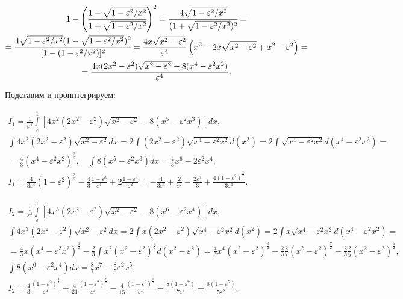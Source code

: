\documentclass[a4paper,12pt]{article} %
\newcommand{\eps}{\varepsilon}
\begin{document}
\begin{equation}
\begin{gathered}
    1 - \Bigg(\cfrac{1 - \sqrt{1 - \eps^2/x^2}}{1 + \sqrt{1 - \eps^2 /
    x^2}}\Bigg)^2 =
    \cfrac{4\sqrt{1 - \eps^2 / x^2}}{(1 + \sqrt{1 - \eps^2 / x^2})^2}=\\
    =\cfrac{4\sqrt{1 - \eps^2 / x^2}(1 - \sqrt{1 - \eps^2 / x^2})^2}
    {[1 - (1 - \eps^2 / x^2)]^2}= \frac{4x\sqrt{x^2-\eps^2}}{\eps^4}
    \left(x^2 - 2x\sqrt{x^2-\eps^2} + x^2 - \eps^2\right)=\\
    =\frac{4x(2x^2-\eps^2)\sqrt{x^2-\eps^2}-8(x^4-\eps^2x^2)}{\eps^4}.
\end{gathered}
\end{equation}

Подставим и проинтегрируем:

\begin{equation}
\begin{gathered}
    I_1 = \frac{1}{\eps^4}\int\limits_\eps^1
    [4x^2(2x^2-\eps^2)\sqrt{x^2-\eps^2}-8(x^5-\eps^2x^3)]dx,\\
    \int 4x^2(2x^2-\eps^2)\sqrt{x^2-\eps^2} dx =
    2\int (2x^2-\eps^2)\sqrt{x^4-\eps^2x^2} d(x^2) =
    2\int \sqrt{x^4-\eps^2x^2} d(x^4-\eps^2x^2) =\\=
    \frac{4}{3}(x^4-\eps^2x^2)^\frac{3}{2},\quad
    \int 8(x^5-\eps^2x^3)dx = \frac{4}{3}x^6 - 2\eps^2x^4,\\
    I_1 = \frac{4}{3\eps^4}(1-\eps^2)^\frac{3}{2} -
    \frac{4}{3}\frac{1-\eps^6}{\eps^4} + 2\frac{1-\eps^4}{\eps^2}=
    -\frac{4}{3\eps^4}+\frac{2}{\eps^2}-\frac{2\eps^2}{3}+\frac{4(1-\eps^2)^\frac{3}{2}}{3\eps^4}.
\end{gathered}
\end{equation}

\begin{equation}
\begin{gathered}
    I_2 = \frac{1}{\eps^4}\int\limits_\eps^1
    [4x^3(2x^2-\eps^2)\sqrt{x^2-\eps^2}-8(x^6-\eps^2x^4)]dx,\\
    \int 4x^3(2x^2-\eps^2)\sqrt{x^2-\eps^2} dx =
    2\int x(2x^2-\eps^2)\sqrt{x^4-\eps^2x^2} d(x^2) =
    2\int x\sqrt{x^4-\eps^2x^2} d(x^4-\eps^2x^2) =\\=
    \frac{4}{3}x(x^4-\eps^2x^2)^\frac{3}{2}-\frac{2}{3}\int
    x^2(x^2-\eps^2)^\frac{3}{2} d(x^2-\eps^2)=
    \frac{4}{3}x^4(x^2-\eps^2)^\frac{3}{2}-
    \frac{2}{3}\frac{2}{7}(x^2-\eps^2)^\frac{7}{2} -
    \frac{2}{3}\frac{2}{5}(x^2-\eps^2)^\frac{5}{2},\\
    \int 8(x^6-\eps^2x^4)dx = \frac{8}{7}x^7 - \frac{8}{5}\eps^2x^5,\\
    I_2 = \frac{4}{3}\frac{(1-\eps^2)^\frac{3}{2}}{\eps^4}-
    \frac{4}{21}\frac{(1-\eps^2)^\frac{7}{2}}{\eps^4} -
    \frac{4}{15}\frac{(1-\eps^2)^\frac{5}{2}}{\eps^4} -
    \frac{8(1-\eps^7)}{7\eps^4} +
    \frac{8(1-\eps^5)}{5\eps^2}.
\end{gathered}
\end{equation}
\end{document}
